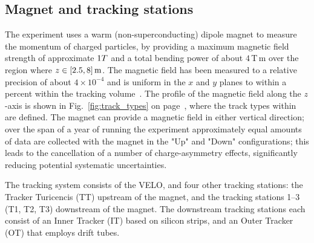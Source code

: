 \subsection{Magnet and tracking stations} %
\label{sub:magnet_and_tracking_stations}

The \lhcb experiment uses a warm (non-superconducting) dipole magnet to measure the momentum of charged particles, by providing a maximum magnetic field strength of approximate $1{T}$ and a total bending power of about $4\,$T\,m over the region where $z\in[2.5, 8]\text{\,m}$. The magnetic field has been measured to a relative precision of about $4\times 10^{-4}$ and is uniform in the $x$ and $y$ planes to within a percent within the tracking volume~\cite{LHCb-detector}. The profile of the magnetic field along the $z$-axis is shown in Fig.~\ref{fig:track_types} on page~\pageref{fig:track_types}, where the track types within \lhcb are defined. The magnet can provide a magnetic field in either vertical direction; over the span of a year of running the experiment approximately equal amounts of data are collected with the magnet in the "Up" and "Down" configurations; this leads to the cancellation of a number of charge-asymmetry effects, significantly reducing potential systematic uncertainties. 

The tracking system consists of the VELO, and four other tracking stations: the Tracker Turicencis (TT) upstream of the magnet, and the tracking stations 1--3 (T1, T2, T3) downstream of the magnet. The downstream tracking stations each consist of an Inner Tracker (IT) based on silicon strips, and an Outer Tracker (OT) that employs drift tubes. 

